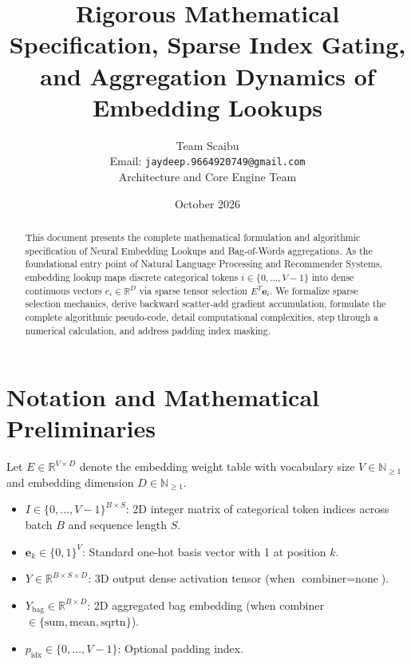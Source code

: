 \documentclass[11pt,a4paper]{article}
\title{\textbf{Rigorous Mathematical Specification, Sparse Index Gating, and Aggregation Dynamics of Embedding Lookups}}
\author{Team Scaibu \\ \small Email: \texttt{jaydeep.9664920749@gmail.com} \\ \small Architecture and Core Engine Team}
\date{October 2026}
\theoremstyle{definition}
\begin{document}
\maketitle

\begin{abstract}
This document presents the complete mathematical formulation and algorithmic specification of Neural Embedding Lookups and Bag-of-Words aggregations. As the foundational entry point of Natural Language Processing and Recommender Systems, embedding lookup maps discrete categorical tokens $i \in \{0, \dots, V-1\}$ into dense continuous vectors $e_i \in \mathbb{R}^D$ via sparse tensor selection $E^T \mathbf{e}_i$. We formalize sparse selection mechanics, derive backward scatter-add gradient accumulation, formulate the complete algorithmic pseudo-code, detail computational complexities, step through a numerical calculation, and address padding index masking.
\end{abstract}

\section{Notation and Mathematical Preliminaries}

Let $E \in \mathbb{R}^{V \times D}$ denote the embedding weight table with vocabulary size $V \in \mathbb{N}_{\ge 1}$ and embedding dimension $D \in \mathbb{N}_{\ge 1}$.

\begin{itemize}
    \item $I \in \{0, \dots, V-1\}^{B \times S}$: 2D integer matrix of categorical token indices across batch $B$ and sequence length $S$.
    \item $\mathbf{e}_k \in \{0, 1\}^V$: Standard one-hot basis vector with 1 at position $k$.
    \item $Y \in \mathbb{R}^{B \times S \times D}$: 3D output dense activation tensor (when $\text{combiner} = \text{none}$).
    \item $Y_{\text{bag}} \in \mathbb{R}^{B \times D}$: 2D aggregated bag embedding (when combiner $\in \{\text{sum}, \text{mean}, \text{sqrtn}\}$).
    \item $p_{\text{idx}} \in \{0, \dots, V-1\}$: Optional padding index.
\end{itemize}
\end{document}
